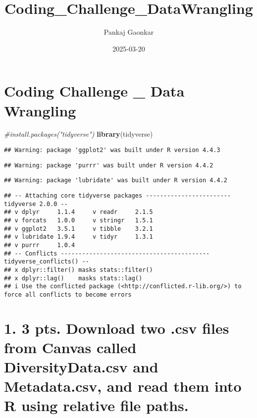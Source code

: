 \documentclass[
]{article}
\title{Coding\_Challenge\_DataWrangling}
\author{Pankaj Gaonkar}
\date{2025-03-20}
\newenvironment{Shaded}{\begin{snugshade}}{\end{snugshade}}
\newcommand{\CommentTok}[1]{\textcolor[rgb]{0.56,0.35,0.01}{\textit{#1}}}
\newcommand{\FunctionTok}[1]{\textcolor[rgb]{0.13,0.29,0.53}{\textbf{#1}}}
\newcommand{\NormalTok}[1]{#1}
\begin{document}
\maketitle

\section{Coding Challenge \_ Data
Wrangling}\label{coding-challenge-_-data-wrangling}

\begin{Shaded}
\begin{Highlighting}[]
\CommentTok{\#install.packages("tidyverse")}
\FunctionTok{library}\NormalTok{(tidyverse)}
\end{Highlighting}
\end{Shaded}

\begin{verbatim}
## Warning: package 'ggplot2' was built under R version 4.4.3
\end{verbatim}

\begin{verbatim}
## Warning: package 'purrr' was built under R version 4.4.2
\end{verbatim}

\begin{verbatim}
## Warning: package 'lubridate' was built under R version 4.4.2
\end{verbatim}

\begin{verbatim}
## -- Attaching core tidyverse packages ------------------------ tidyverse 2.0.0 --
## v dplyr     1.1.4     v readr     2.1.5
## v forcats   1.0.0     v stringr   1.5.1
## v ggplot2   3.5.1     v tibble    3.2.1
## v lubridate 1.9.4     v tidyr     1.3.1
## v purrr     1.0.4     
## -- Conflicts ------------------------------------------ tidyverse_conflicts() --
## x dplyr::filter() masks stats::filter()
## x dplyr::lag()    masks stats::lag()
## i Use the conflicted package (<http://conflicted.r-lib.org/>) to force all conflicts to become errors
\end{verbatim}

\section{1. 3 pts. Download two .csv files from Canvas called
DiversityData.csv and Metadata.csv, and read them into R using relative
file
paths.}\label{pts.-download-two-.csv-files-from-canvas-called-diversitydata.csv-and-metadata.csv-and-read-them-into-r-using-relative-file-paths.}
\end{document}
